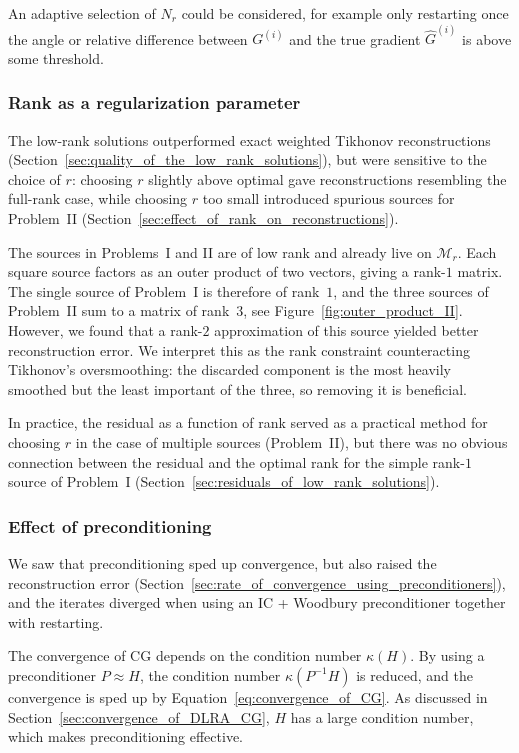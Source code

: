 An adaptive selection of $N_r$ could be considered, for example only restarting once the angle or relative difference between $G^{(i)}$ and the true gradient $\hat G^{(i)}$ is above some threshold.


\subsubsection{Rank as a regularization parameter}\label{sec:rank_as_a_regularization_parameter}

The low-rank solutions outperformed exact weighted Tikhonov reconstructions (Section~\ref{sec:quality_of_the_low_rank_solutions}), but were sensitive to the choice of $r$: choosing $r$ slightly above optimal gave reconstructions resembling the full-rank case, while choosing $r$ too small introduced spurious sources for Problem~II
(Section~\ref{sec:effect_of_rank_on_reconstructions}).

The sources in Problems~I and II are of low rank and already live on $\mathcal{M}_r$. Each square source factors as an outer product of two vectors, giving a rank-$1$ matrix. The single source of Problem~I is therefore of rank~$1$, and the three sources of Problem~II sum to a matrix of rank~$3$, see Figure~\ref{fig:outer_product_II}. However, we found that a rank-$2$ approximation of this source yielded better reconstruction error. We interpret this as the rank constraint counteracting Tikhonov's oversmoothing: the discarded component is the most heavily smoothed but the least important of the three, so removing it is beneficial.

In practice, the residual as a function of rank served as a practical method for choosing $r$ in the case of multiple sources (Problem~II), but there was no obvious connection between the residual and the optimal rank for the simple rank-$1$ source of Problem~I (Section~\ref{sec:residuals_of_low_rank_solutions}).


\subsubsection{Effect of preconditioning}
We saw that preconditioning sped up convergence, but also raised the reconstruction error (Section~\ref{sec:rate_of_convergence_using_preconditioners}), and the iterates diverged when using an IC + Woodbury preconditioner together with restarting.

The convergence of CG depends on the condition number $\kappa(H)$. By using a preconditioner $P \approx H$, the condition number $\kappa(P^{-1} H)$ is reduced, and the convergence is sped up by Equation~\eqref{eq:convergence_of_CG}. As discussed in Section~\ref{sec:convergence_of_DLRA_CG}, $H$ has a large condition number, which makes preconditioning effective.

